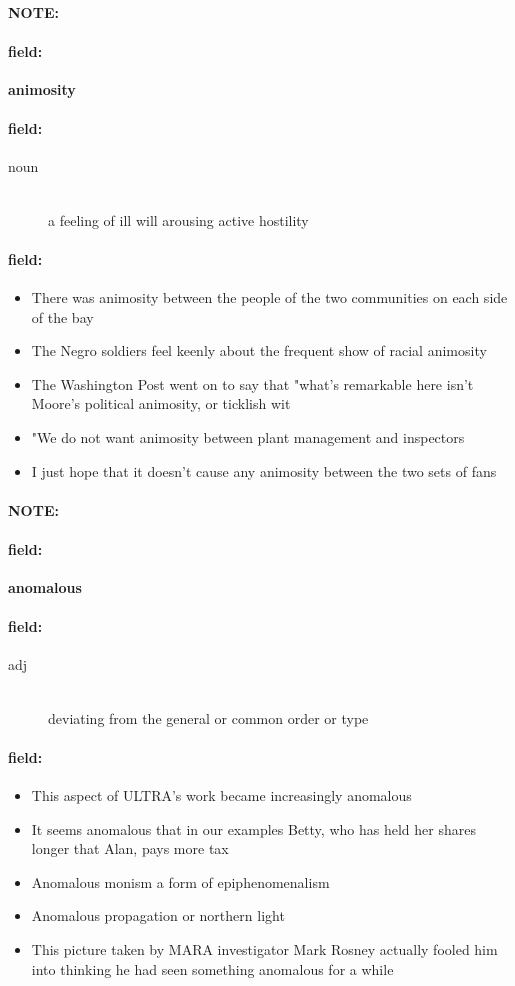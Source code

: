 \documentclass[12pt]{article}
\newenvironment{note}{\paragraph{NOTE:}}{}
\newenvironment{field}{\paragraph{field:}}{}
\begin{document}
\begin{note}
\begin{field}
\textbf{\large animosity}
\end{field}


\begin{field}
\begin{description}
\item[noun] \hfill \\ 
a feeling of ill will arousing active hostility

\end{description}
\end{field}

\begin{field}
\begin{itemize}
\item There was animosity between the people of the two communities on each side of the bay
\item The Negro soldiers feel keenly about the frequent show of racial animosity
\item The Washington Post went on to say that "what's remarkable here isn't Moore's political animosity, or ticklish wit
\item "We do not want animosity between plant management and inspectors
\item I just hope that it doesn't cause any animosity between the two sets of fans
\end{itemize}
\end{field}
\end{note}
\begin{note}
\begin{field}
\textbf{\large anomalous}
\end{field}


\begin{field}
\begin{description}
\item[adj] \hfill \\ 
deviating from the general or common order or type

\end{description}
\end{field}

\begin{field}
\begin{itemize}
\item This aspect of ULTRA's work became increasingly anomalous
\item It seems anomalous that in our examples Betty, who has held her shares longer that Alan, pays more tax
\item Anomalous monism a form of epiphenomenalism
\item Anomalous propagation or northern light
\item This picture taken by MARA investigator Mark Rosney actually fooled him into thinking he had seen something anomalous for a while
\end{itemize}
\end{field}
\end{note}
\end{document}
